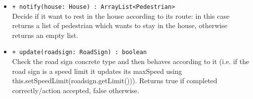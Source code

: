 \begin{itemize}
\begin{itemize}
    \item  \texttt{+ notify(house: House) : ArrayList<Pedestrian>} \\
Decide if it want to rest in the house according to its route: in this case
returns a list of pedestrian which wants to stay in the house, otherwise returns
an empty list.
    \item  \texttt{+ update(roadsign: RoadSign) : boolean} \\
Check the road sign concrete type and then behaves according to it (i.e. if the
road sign is a speed limit it updates its maxSpeed using this.setSpeedLimit(roadsign.getLimit())). Returns true if completed correctly/action accepted, false otherwise.
  \end{itemize}
\end{itemize}
